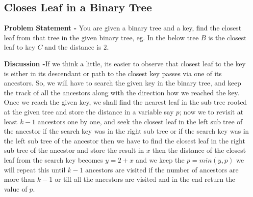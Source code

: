\documentclass[12pt,a4paper,draft]{article}
\begin{document}
\subsection{Closes Leaf in a Binary Tree}
\textbf{Problem Statement -} You are given a binary tree and a key, find the closest leaf from that tree in the given binary tree, eg. In the below tree $B$ is the closest leaf to key $C$ and the distance is $2$.
\begin{center}
\end{center}
\textbf{Discussion -}If we think a little, its easier to observe that closest leaf to the key is either in its descendant or path to the closest key passes via one of its ancestors. So, we will have to search the given key in the binary tree, and keep the track of all the ancestors along with the direction how we reached the key. Once we reach the given key, we shall find the nearest leaf in the sub tree rooted at the given tree and store the distance in a variable say $p$; now we to revisit at least $k-1$ ancestors one by one, and seek the closest leaf in the left sub tree of the ancestor if the search key was in the right sub tree or if the search key was in the left sub tree of the ancestor then we have to find the closest leaf in the right sub tree of the ancestor and store the result in $x$ then the distance of the closest leaf from the search key becomes $y=2+x$ and we keep the $p=min(y,p)$ we will repeat this until $k-1$ ancestors are visited if the number of ancestors are more than $k-1$ or till all the ancestors are visited and in the end return the value of $p$.
\pagebreak
\end{document}

